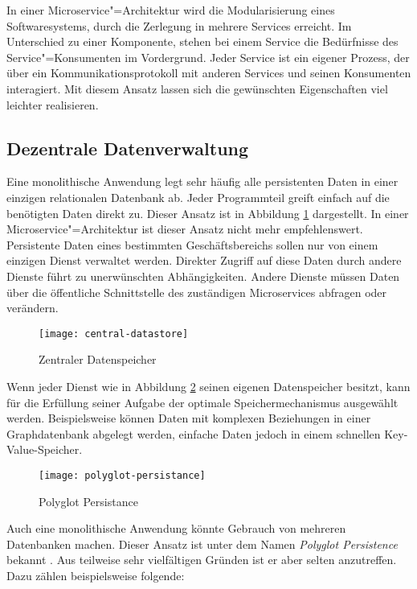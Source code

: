 In einer Microservice"=Architektur wird die Modularisierung eines Softwaresystems, durch die Zerlegung in mehrere Services erreicht. Im Unterschied zu einer Komponente, stehen bei einem Service die Bedürfnisse des Service"=Konsumenten im Vordergrund. Jeder Service ist ein eigener Prozess, der über ein Kommunikationsprotokoll mit anderen Services und seinen Konsumenten interagiert. Mit diesem Ansatz lassen sich die gewünschten Eigenschaften viel leichter realisieren.

\subsection{Dezentrale Datenverwaltung}
\label{subsec:polyglot-persistance}

Eine monolithische Anwendung legt sehr häufig alle persistenten Daten in einer einzigen relationalen Datenbank ab. Jeder Programmteil greift einfach auf die benötigten Daten direkt zu. Dieser Ansatz ist in Abbildung \ref{fig:central-datastore} dargestellt. In einer Microservice"=Architektur ist dieser Ansatz nicht mehr empfehlenswert. Persistente Daten eines bestimmten Geschäftsbereichs sollen nur von einem einzigen Dienst verwaltet werden. Direkter Zugriff auf diese Daten durch andere Dienste führt zu unerwünschten Abhängigkeiten. Andere Dienste müssen Daten über die öffentliche Schnittstelle des zuständigen Microservices abfragen oder verändern.

\begin{figure}[h]
  \centering
	\texttt{[image: central-datastore]}
	\caption{Zentraler Datenspeicher}
	\label{fig:central-datastore}
\end{figure}

Wenn jeder Dienst wie in Abbildung \ref{fig:polyglot-persistnace} seinen eigenen Datenspeicher besitzt, kann für die Erfüllung seiner Aufgabe der optimale Speichermechanismus ausgewählt werden. Beispielsweise können Daten mit komplexen Beziehungen in einer Graphdatenbank abgelegt werden, einfache Daten jedoch in einem schnellen Key-Value-Speicher.

\begin{figure}[h]
  \centering
	\texttt{[image: polyglot-persistance]}
	\caption{Polyglot Persistance}
	\label{fig:polyglot-persistnace}
\end{figure}

Auch eine monolithische Anwendung könnte Gebrauch von mehreren Datenbanken machen. Dieser Ansatz ist unter dem Namen \textit{Polyglot Persistence} bekannt \cite{FowlerPP}. Aus teilweise sehr vielfältigen Gründen ist er aber selten anzutreffen. Dazu zählen beispielsweise folgende:

